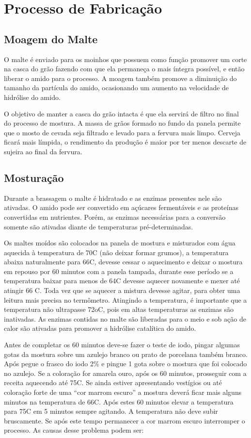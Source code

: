 \clearpage
\section{Processo de Fabricação}

\subsection{Moagem do Malte}

O malte é enviado para os moinhos que possuem como função promover um corte na casca do grão fazendo com que ela permaneça o mais íntegra possível, e então liberar o amido para o processo. A moagem também promove a diminuição do tamanho da partícula do amido, ocasionando um aumento na velocidade de hidrólise do amido.

O objetivo de manter a casca do grão intacta é que ela servirá de filtro no final do processo de mostura. A massa de grãos formado no fundo da panela permite que o mosto de cevada seja filtrado e levado para a fervura mais limpo. Cerveja ficará mais límpida, o rendimento da produção é maior por ter menos descarte de sujeira ao final da fervura.

\subsection{Mosturação}
Durante a brassagem o malte é hidratado e as enzimas presentes nele são ativadas. O amido pode ser convertido em açúcares fermentáveis e as proteínas convertidas em nutrientes. Porém, as enzimas necessárias para a conversão somente são ativadas diante de temperaturas pré-determinadas.

Os maltes moídos são colocados na panela de mostura e misturados com água aquecida à temperatura de 70\textdegree C (não deixar formar grumos), a temperatura abaixa naturalmente para 66\textdegree C, devesse cessar o aquecimento e deixar o mostura em repouso por 60 minutos com a panela tampada, durante esse período se a temperatura baixar para menos de 64\textdegree C devesse aquecer novamente e mexer até atingir 66 \textdegree C. Toda vez que se aquecer a mistura devesse agitar, para obter uma leitura mais precisa no termômetro. Atingindo a temperatura, é importante que a temperatura não ultrapasse 72oC, pois em altas temperaturas as enzimas são inativadas. As enzimas contidas no malte são liberadas para o meio e sob ação de calor são ativadas para promover a hidrólise catalítica do amido.

Antes de completar os 60 minutos deve-se fazer o teste de iodo, pingar algumas gotas da mostura sobre um azulejo branco ou prato de porcelana também branco. Após pegue o frasco do iodo 2\% e pingue 1 gota sobre o mostura que foi colocado no azulejo. Se a coloração for amarela ouro, após os 60 minutos, prosseguir com a receita aquecendo até 75\textdegree C. Se ainda estiver apresentando vestígios ou até coloração forte de uma “cor marrom escuro” a mostura deverá ficar mais alguns minutos na temperatura de 66\textdegree C.
Após estes 60 minutos elevar a temperatura para 75\textdegree C em 5 minutos sempre agitando. A temperatura não deve subir bruscamente. Se após este tempo permanecer a cor marrom escuro interromper o processo. As causas desse problema podem ser:

